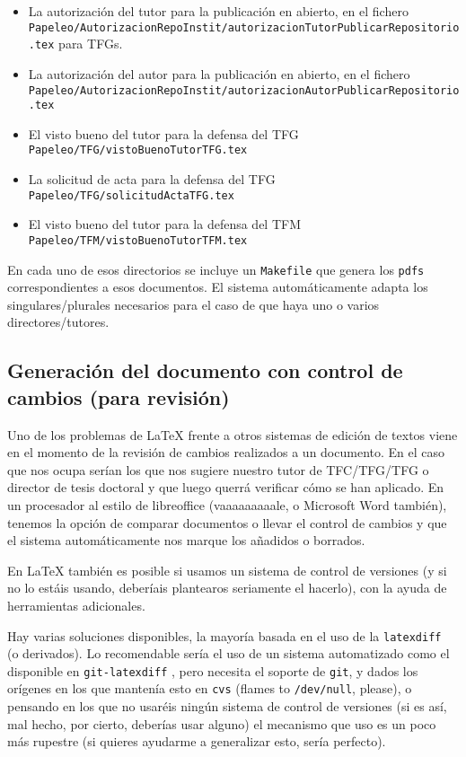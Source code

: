 \begin{itemize}
\item La autorización del tutor para la publicación en abierto, en el
  fichero
  \texttt{Papeleo/AutorizacionRepoInstit/autorizacionTutorPublicarRepositorio.tex}
  para TFGs.
\item La autorización del autor para la publicación en abierto, en el
  fichero
  \texttt{Papeleo/AutorizacionRepoInstit/autorizacionAutorPublicarRepositorio.tex}
\item El visto bueno del tutor para la defensa del TFG
  \texttt{Papeleo/TFG/vistoBuenoTutorTFG.tex}
\item La solicitud de acta para la defensa del TFG
  \texttt{Papeleo/TFG/solicitudActaTFG.tex}
\item El visto bueno del tutor para la defensa del TFM
  \texttt{Papeleo/TFM/vistoBuenoTutorTFM.tex}
\end{itemize}

En cada uno de esos directorios se incluye un \texttt{Makefile} que
genera los \texttt{pdfs} correspondientes a esos documentos. El
sistema automáticamente adapta los singulares/plurales necesarios para
el caso de que haya uno o varios directores/tutores.


\subsection{Generación del documento con control de cambios (para
  revisión)}
\label{sec:control-de-cambios}

Uno de los problemas de \LaTeX{} frente a otros sistemas de edición de
textos viene en el momento de la revisión de cambios realizados a un
documento. En el caso que nos ocupa serían los que nos sugiere nuestro
tutor de TFC/TFG/TFG o director de tesis doctoral y que luego querrá
verificar cómo se han aplicado. En un procesador al estilo de
libreoffice (vaaaaaaaaale, o Microsoft Word también), tenemos la opción
de comparar documentos o llevar el control de cambios y que el sistema
automáticamente nos marque los añadidos o borrados. 

En \LaTeX{} también es posible si usamos un sistema de control de
versiones (y si no lo estáis usando, deberíais plantearos seriamente el
hacerlo), con la ayuda de herramientas adicionales.

Hay varias soluciones disponibles, la mayoría basada en el uso de la
\texttt{latexdiff}~\cite{latexdiff} (o derivados). Lo recomendable
sería el uso de un sistema automatizado como el disponible en
\texttt{git-latexdiff} \cite{git-latexdiff}, pero necesita el soporte
de \texttt{git}, y dados los orígenes en los que mantenía esto en
\texttt{cvs} (flames to \texttt{/dev/null}, please), o pensando en los
que no usaréis ningún sistema de control de versiones (si es así, mal
hecho, por cierto, deberías usar alguno) el mecanismo que uso es un
poco más rupestre (si quieres ayudarme a generalizar esto, sería
perfecto).

